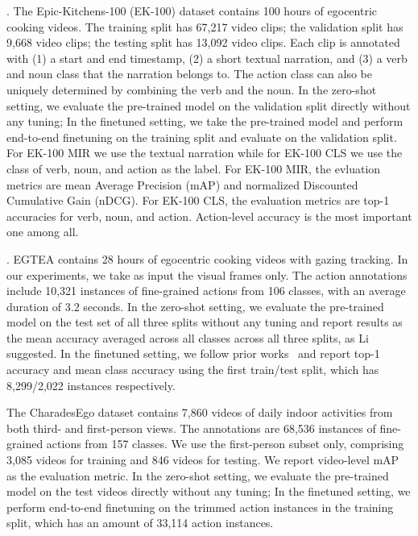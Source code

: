 \documentclass[10pt,twocolumn,letterpaper]{article}
\newcommand{\myparagraph}[1]{\vspace{0pt}\noindent{\bf #1}}
\newcommand{\ek}{EK-100\xspace}
\newcommand{\ekmir}{EK-100 MIR\xspace}
\newcommand{\ekcls}{EK-100 CLS\xspace}
\begin{document}
\myparagraph{\ek}.
The Epic-Kitchens-100 (\ek) dataset contains 100 hours of egocentric cooking videos.
The training split has 67,217 video clips; the validation split has 9,668 video clips; the testing split has 13,092 video clips.
Each clip is annotated with (1) a start and end timestamp, (2) a short textual narration, and (3) a verb and noun class that the narration belongs to.
The action class can also be uniquely determined by combining the verb and the noun.
In the zero-shot setting, we evaluate the pre-trained model on the validation split directly without any tuning;
In the finetuned setting, we take the pre-trained model and perform end-to-end finetuning on the training split and evaluate on the validation split.
For \ekmir we use the textual narration while for \ekcls we use the class of verb, noun, and action as the label.
For \ekmir, the evluation metrics are mean Average Precision (mAP) and normalized Discounted Cumulative Gain (nDCG).
For \ekcls, the evaluation metrics are top-1 accuracies for verb, noun, and action.
Action-level accuracy is the most important one among all.

\myparagraph{EGTEA}.
EGTEA contains 28 hours of egocentric cooking videos with gazing tracking.
In our experiments, we take as input the visual frames only.
The action annotations include 10,321 instances of fine-grained actions from 106 classes, with an average duration of 3.2 seconds.
In the zero-shot setting, we evaluate the pre-trained model on the test set of all three splits without any tuning and report results as the mean accuracy averaged across all classes across all three splits, as Li~\etal~\cite{li2018egtea} suggested.
In the finetuned setting, we follow prior works~\cite{kazakos2021little} and report top-1 accuracy and mean class accuracy using the first train/test split, which has 8,299/2,022 instances respectively.


\myparagraph{CharadesEgo.}
The CharadesEgo dataset contains 7,860 videos of daily indoor activities from both third- and first-person views.
The annotations are 68,536 instances of fine-grained actions from 157 classes.
We use the first-person subset only, comprising 3,085 videos for training and 846 videos for testing.
We report video-level mAP as the evaluation metric.
In the zero-shot setting, we evaluate the pre-trained model on the test videos directly without any tuning;
In the finetuned setting, we perform end-to-end finetuning on the trimmed action instances in the training split, which has an amount of 33,114 action instances.
\end{document}
